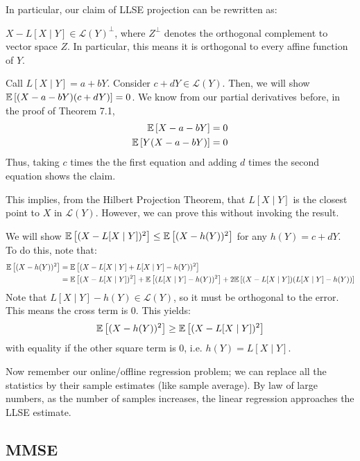In particular, our claim of LLSE projection can be rewritten as:

\begin{theorem}
    $X - L[X \mid Y] \in \mathcal{L}(Y)^{\perp}$, where $Z^\perp$ denotes the orthogonal complement to vector space $Z$. In particular, this means it is orthogonal
    to every affine function of $Y$.

    \begin{proof*}
        Call $L[X \mid Y] = a + bY$. Consider $c + dY \in \mathcal{L}(Y)$. Then, we will show $\mathbb{E}\left[ (X - a - bY)(c + dY) \right] = 0$.
        We know from our partial derivatives before, in the proof of Theorem 7.1,
        \begin{align*}
            \mathbb{E}\left[ X - a - bY \right] &= 0 \\
            \mathbb{E}\left[ Y(X - a - bY) \right] &= 0
        \end{align*}
        Thus, taking $c$ times the the first equation and adding $d$ times the second equation shows the claim.
    \end{proof*}
\end{theorem}


This implies, from the Hilbert Projection Theorem, that $L[X \mid Y]$ is the closest point to $X$ in $\mathcal{L}(Y)$. However, we can prove this
without invoking the result.

\begin{proof*}
    We will show $\mathbb{E}\left[ (X - L[X \mid Y])^2 \right] \leq \mathbb{E}\left[ (X - h(Y))^2 \right]$ for any $h(Y) = c + dY$. To do this, note that:
    \begin{align*}
        \mathbb{E}\left[ (X - h(Y))^2 \right] &= \mathbb{E}\left[ (X - L[X\mid Y] + L[X \mid Y] - h(Y))^2 \right] \\
        &= \mathbb{E}\left[ (X - L[X \mid Y])^2 \right] + \mathbb{E}\left[ (L[X \mid Y] - h(Y))^2 \right] + 2 \mathbb{E}\left[ (X - L[X \mid Y])(L[X \mid Y] - h(Y)) \right]
    \end{align*}
    Note that $L[X \mid Y] - h(Y) \in \mathcal{L}(Y)$, so it must be orthogonal to the error. This means the cross term is 0. This yields:
    \[ \mathbb{E}\left[ (X - h(Y))^2 \right] \geq \mathbb{E}\left[ (X - L[X \mid Y])^2 \right] \]
    with equality if the other square term is 0, i.e. $h(Y) = L[X \mid Y]$.
\end{proof*}

Now remember our online/offline regression problem; we can replace all the statistics by their sample estimates (like sample average). By law of large numbers,
as the number of samples increases, the linear regression approaches the LLSE estimate.

\subsection{MMSE}

